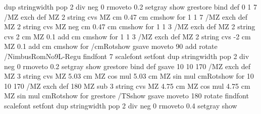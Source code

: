 {{{                            dup %
                            stringwidth pop 2 div neg 0 %
                            rmoveto 0.2 setgray show
                      grestore
                 } bind def
      0 1 7 { /MZ exch def MZ 2 string cvs MZ cm 0.47 cm cmshow } for %
      1 1 7 { /MZ exch def MZ 2 string cvs MZ neg cm 0.47 cm cmshow } for %
      1 1 3 { /MZ exch def MZ 2 string cvs 2 cm MZ 0.1 add cm cmshow } for %
      1 1 3 { /MZ exch def MZ 2 string cvs -2 cm MZ 0.1 add cm cmshow } for %
  /cmRotshow {%
                             gsave
                                    moveto 90 add rotate  %
                                    /NimbusRomNo9L-Regu findfont 7 scalefont setfont
                                    dup %
                                    stringwidth pop 2 div neg 0 %
                                    rmoveto 0.2 setgray show
                             grestore
                          } bind def
  gsave
      10 10 170 { /MZ exch def MZ 3 string cvs  MZ 5.03 cm MZ cos mul 5.03 cm MZ sin mul  cmRotshow } for %
      10 10 170 { /MZ exch def 180 MZ sub 3 string cvs  MZ 4.75 cm MZ cos mul 4.75 cm MZ sin mul  cmRotshow } for %
 grestore
 /TSshow {%
                         gsave
                         moveto 180 rotate  %
                         \pst@PSfontO\space findfont \pst@fontsizeO scalefont setfont
                         dup %
                         stringwidth pop 2 div neg 0 %
                         rmoveto 0.4 setgray show
}}}
